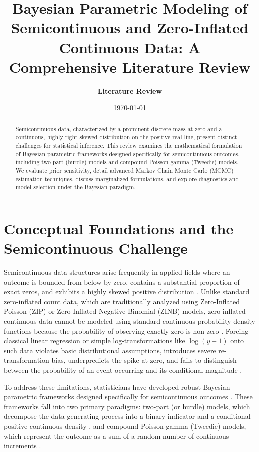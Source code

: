 \documentclass[11pt, a4paper]{article}
\title{\textbf{Bayesian Parametric Modeling of Semicontinuous and Zero-Inflated Continuous Data: A Comprehensive Literature Review}}
\author{\textbf{Literature Review}}
\date{\today}
\begin{document}
\maketitle

\begin{abstract}
Semicontinuous data, characterized by a prominent discrete mass at zero and a continuous, highly right-skewed distribution on the positive real line, present distinct challenges for statistical inference. This review examines the mathematical formulation of Bayesian parametric frameworks designed specifically for semicontinuous outcomes, including two-part (hurdle) models and compound Poisson-gamma (Tweedie) models. We evaluate prior sensitivity, detail advanced Markov Chain Monte Carlo (MCMC) estimation techniques, discuss marginalized formulations, and explore diagnostics and model selection under the Bayesian paradigm.
\end{abstract}

\section{Conceptual Foundations and the Semicontinuous Challenge}

Semicontinuous data structures arise frequently in applied fields where an outcome is bounded from below by zero, contains a substantial proportion of exact zeros, and exhibits a highly skewed positive distribution \cite{ref1, ref2, ref3}. Unlike standard zero-inflated count data, which are traditionally analyzed using Zero-Inflated Poisson (ZIP) or Zero-Inflated Negative Binomial (ZINB) models, zero-inflated continuous data cannot be modeled using standard continuous probability density functions because the probability of observing exactly zero is non-zero \cite{ref2, ref4}. Forcing classical linear regression or simple log-transformations like $\log(y + 1)$ onto such data violates basic distributional assumptions, introduces severe re-transformation bias, underpredicts the spike at zero, and fails to distinguish between the probability of an event occurring and its conditional magnitude \cite{ref5, ref6}.

To address these limitations, statisticians have developed robust Bayesian parametric frameworks designed specifically for semicontinuous outcomes \cite{ref1, ref4, ref7}. These frameworks fall into two primary paradigms: two-part (or hurdle) models, which decompose the data-generating process into a binary indicator and a conditional positive continuous density \cite{ref1, ref4, ref8}, and compound Poisson-gamma (Tweedie) models, which represent the outcome as a sum of a random number of continuous increments \cite{ref9, ref10, ref11}.
\end{document}
